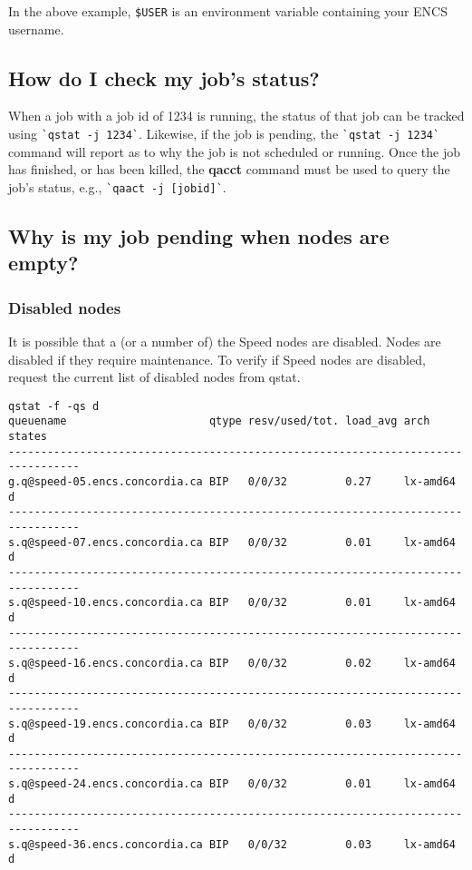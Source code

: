 In the above example, \verb!$USER! is an environment variable containing your ENCS username.

\subsection{How do I check my job's status?}

When a job with a job id of 1234 is running, the status of that job can be tracked using \verb!`qstat -j 1234`!.
Likewise, if the job is pending, the \verb!`qstat -j 1234`! command will report as to why the job is not scheduled or running.
Once the job has finished, or has been killed, the \textbf{qacct} command must be used to query the job's status, e.g., \verb!`qaact -j [jobid]`!. 

\subsection{Why is my job pending when nodes are empty?}

\subsubsection{Disabled nodes}

It is possible that a (or a number of) the Speed nodes are disabled. Nodes are disabled if they require maintenance. 
To verify if Speed nodes are disabled, request the current list of disabled nodes from qstat.

\begin{verbatim}
qstat -f -qs d
queuename                      qtype resv/used/tot. load_avg arch          states
---------------------------------------------------------------------------------
g.q@speed-05.encs.concordia.ca BIP   0/0/32         0.27     lx-amd64      d
---------------------------------------------------------------------------------
s.q@speed-07.encs.concordia.ca BIP   0/0/32         0.01     lx-amd64      d
---------------------------------------------------------------------------------
s.q@speed-10.encs.concordia.ca BIP   0/0/32         0.01     lx-amd64      d
---------------------------------------------------------------------------------
s.q@speed-16.encs.concordia.ca BIP   0/0/32         0.02     lx-amd64      d
---------------------------------------------------------------------------------
s.q@speed-19.encs.concordia.ca BIP   0/0/32         0.03     lx-amd64      d
---------------------------------------------------------------------------------
s.q@speed-24.encs.concordia.ca BIP   0/0/32         0.01     lx-amd64      d
---------------------------------------------------------------------------------
s.q@speed-36.encs.concordia.ca BIP   0/0/32         0.03     lx-amd64      d
\end{verbatim}


